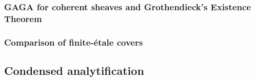         \subsubsection{GAGA for coherent sheaves and Grothendieck's Existence Theorem}
        
        \subsubsection{Comparison of finite-\'etale covers}
        
    \subsection{Condensed analytification}